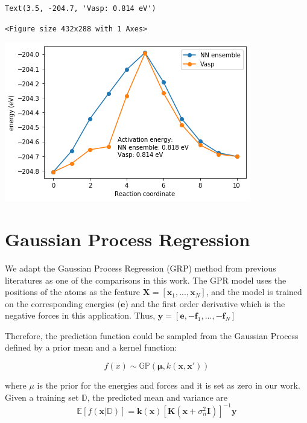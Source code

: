 \documentclass[aps,prl,citeautoscript,preprint,citeautoscript,showkeys]{revtex4-1}
\begin{document}
\begin{verbatim}
Text(3.5, -204.7, 'Vasp: 0.814 eV')
\end{verbatim}


\begin{verbatim}
<Figure size 432x288 with 1 Axes>
\end{verbatim}


\begin{center}
\includegraphics[width=.9\linewidth]{obipy-resources/488c510fd61eaf8a765856c1b3f36ad3-270445Ym.png}
\end{center}


\section{Gaussian Process Regression}
\label{sec:orgc135a39}
We adapt the Gaussian Process Regression (GRP) method from previous literatures \cite{torres-2019-low-scalin,koistinen-2017-nudged-elast} as one of the comparisons in this work. The GPR model uses the positions of the atoms as the feature \(\textbf{X} = [\textbf{x}_1, ..., \textbf{x}_N]\), and the model is trained on the corresponding energies (\(\textbf{e}\)) and the first order derivative which is the negative forces in this application. Thus,  \(\textbf{y} = [\textbf{e}, -\textbf{f}_1, ..., -\textbf{f}_N]\)

Therefore, the prediction function could be sampled from the Gaussian Process defined by a prior mean and a kernel function:

\begin{equation}
f(x) \sim \mathbb{GP}\left(\boldsymbol{\mu}, k\left( \boldsymbol{x}, \boldsymbol{x'} \right) \right)
\end{equation}

where \({\mu}\) is the prior for the energies and forces and it is set as zero in our work. Given a training set \(\mathbb{D}\), the predicted mean and variance are
\begin{equation}
\mathbb{E} \left[ f(\boldsymbol{x}| \mathbb{D})\right] = \boldsymbol{k}(\boldsymbol{x}) \left[ \boldsymbol{K} (\boldsymbol{x} + \sigma_{n}^2 \boldsymbol{I})\right]^{-1} \boldsymbol{y}
\end{equation}
\end{document}
